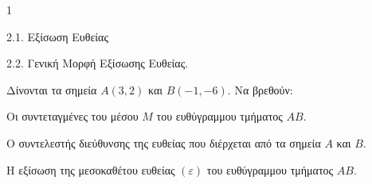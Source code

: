 \begin{ylh}{1}
    \item 2.1. Εξίσωση Ευθείας
    \item 2.2. Γενική Μορφή Εξίσωσης Ευθείας.
\end{ylh}
Δίνονται τα σημεία $A(3,2)$ και $B(-1,-6)$. Να βρεθούν:
\begin{alist}
\item Οι συντεταγμένες του μέσου $M$ του ευθύγραμμου τμήματος $AB$.  
\item Ο συντελεστής διεύθυνσης της ευθείας που διέρχεται από τα σημεία $A$ και $B$.  
\item Η εξίσωση της μεσοκαθέτου ευθείας $(\varepsilon)$ του ευθύγραμμου τμήματος $AB$.  
\end{alist}
